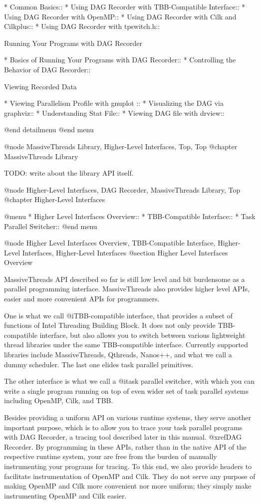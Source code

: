 * Common Basics::
* Using DAG Recorder with TBB-Compatible Interface::
* Using DAG Recorder with OpenMP::
* Using DAG Recorder with Cilk and Cilkplus::
* Using DAG Recorder with tpswitch.h::

Running Your Programs with DAG Recorder

* Basics of Running Your Programs with DAG Recorder::
* Controlling the Behavior of DAG Recorder::

Viewing Recorded Data

* Viewing Parallelism Profile with gnuplot ::
* Visualizing the DAG via graphviz::
* Understanding Stat File::
* Viewing DAG file with drview::

@end detailmenu
@end menu

@node MassiveThreads Library, Higher-Level Interfaces, Top, Top
@chapter MassiveThreads Library

TODO: write about the library API itself.

@node Higher-Level Interfaces, DAG Recorder, MassiveThreads Library, Top
@chapter Higher-Level Interfaces

@menu
* Higher Level Interfaces Overview::
* TBB-Compatible Interface::
* Task Parallel Switcher::
@end menu

@node Higher Level Interfaces Overview, TBB-Compatible Interface, Higher-Level Interfaces, Higher-Level Interfaces
@section Higher Level Interfaces Overview

MassiveThreads API described so far is still low level and bit
burdensome as a parallel programming interface.  MassiveThreads also
provides higher level APIs, easier and more convenient APIs for
programmers.

One is what we call @i{TBB-compatible interface}, that provides a subset
of functions of Intel Threading Building Block.  It does not only
provide TBB-compatible interface, but also allows you to switch between
various lightweight thread libraries under the same TBB-compatible
interface.  Currently supported libraries include MassiveThreads,
Qthreads, Nanos++, and what we call a dummy scheduler.  The last one
elides task parallel primitives.

The other interface is what we call a @i{task parallel switcher}, with
which you can write a single program running on top of even wider set of
task parallel systems including OpenMP, Cilk, and TBB.

Besides providing a uniform API on various runtime systems, they serve
another important purpose, which is to allow you to trace your task
parallel programs with DAG Recorder, a tracing tool described later in
this manual. @xref{DAG Recorder}. By programming in these APIs, rather
than in the native API of the respective runtime system, your are free
from the burden of manually instrumenting your programs for tracing.  To
this end, we also provide headers to facilitate instrumentation of
OpenMP and Cilk.  They do not serve any purpose of making OpenMP and
Cilk more convenient nor more uniform; they simply make instrumenting
OpenMP and Cilk easier.

